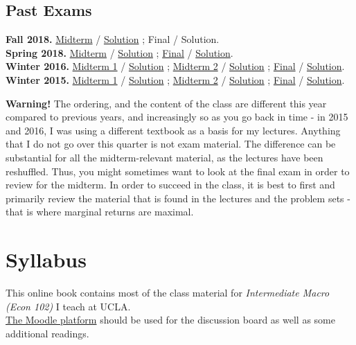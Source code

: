 \documentclass[]{book}
\theoremstyle{definition}
\theoremstyle{definition}
\theoremstyle{definition}
\theoremstyle{remark}
\begin{document}
\section*{Past Exams}\label{past-exams}

\textbf{Fall 2018.} \href{past-exams/2018F-midterm.pdf}{Midterm} /
\href{past-exams/2018F-midterm-solution.pdf}{Solution} ; Final /
Solution.\\
\textbf{Spring 2018.} \href{past-exams/2018S-midterm.pdf}{Midterm} /
\href{past-exams/2018S-midterm-solution.pdf}{Solution} ;
\href{past-exams/2018S-final.pdf}{Final} /
\href{past-exams/2018S-final-solution.pdf}{Solution}.\\
\textbf{Winter 2016.} \href{past-exams/2016W-midterm1.pdf}{Midterm 1} /
\href{past-exams/2016W-midterm1-solution.pdf}{Solution} ;
\href{past-exams/2016W-midterm2.pdf}{Midterm 2} /
\href{past-exams/2016W-midterm2-solution.pdf}{Solution} ;
\href{past-exams/2016W-final.pdf}{Final} /
\href{past-exams/2016W-final-solution.pdf}{Solution}.\\
\textbf{Winter 2015.} \href{past-exams/2015W-midterm1.pdf}{Midterm 1} /
\href{past-exams/2015W-midterm1-solution.pdf}{Solution} ;
\href{past-exams/2015W-midterm2.pdf}{Midterm 2} /
\href{past-exams/2015W-midterm2-solution.pdf}{Solution} ;
\href{past-exams/2015W-final.pdf}{Final} /
\href{past-exams/2015W-final-solution.pdf}{Solution}.

\textbf{Warning!} The ordering, and the content of the class are
different this year compared to previous years, and increasingly so as
you go back in time - in 2015 and 2016, I was using a different textbook
as a basis for my lectures. Anything that I do not go over this quarter
is not exam material. The difference can be substantial for all the
midterm-relevant material, as the lectures have been reshuffled. Thus,
you might sometimes want to look at the final exam in order to review
for the midterm. In order to succeed in the class, it is best to first
and primarily review the material that is found in the lectures and the
problem sets - that is where marginal returns are maximal.

\chapter*{Syllabus}\label{syllabus}

This online book contains most of the class material for
\emph{Intermediate Macro (Econ 102)} I teach at UCLA.\\
\href{https://moodle2.sscnet.ucla.edu/course/view/18F-ECON102-1}{The
Moodle platform} should be used for the discussion board as well as some
additional readings.
\end{document}
